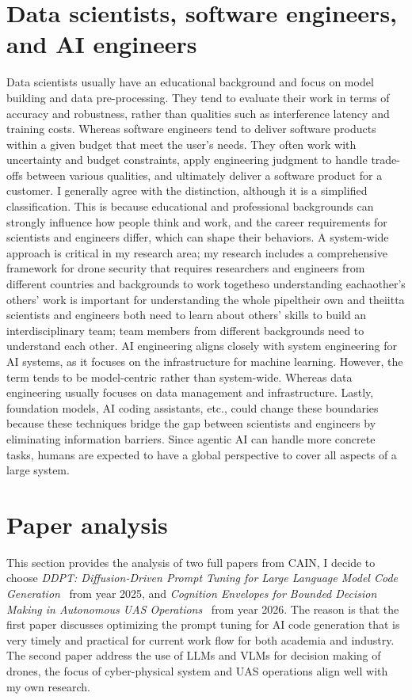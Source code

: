 \documentclass[11pt]{article}
\begin{document}
\section{Data scientists, software engineers, and AI engineers}
Data scientists usually have an educational background and focus on model building and data pre-processing. They tend to evaluate their work in terms of accuracy and robustness, rather than qualities such as interference latency and training costs. Whereas software engineers tend to deliver software products within a given budget that meet the user's needs. They often work with uncertainty and budget constraints, apply engineering judgment to handle trade-offs between various qualities, and ultimately deliver a software product for a customer. I generally agree with the distinction, although it is a simplified classification. This is because educational and professional backgrounds can strongly influence how people think and work, and the career requirements for scientists and engineers differ, which can shape their behaviors. A system-wide approach is critical in my research area; my research includes a comprehensive framework for drone security that requires researchers and engineers from different countries and backgrounds to work togetheso understanding eachaother's others' work is important for understanding the whole pipeltheir own and theiitta scientists and engineers both need to learn about others' skills to build an interdisciplinary team; team members from different backgrounds need to understand each other. AI engineering aligns closely with system engineering for AI systems, as it focuses on the infrastructure for machine learning. However, the term tends to be model-centric rather than system-wide. Whereas data engineering usually focuses on data management and infrastructure. Lastly, foundation models, AI coding assistants, etc., could change these boundaries because these techniques bridge the gap between scientists and engineers by eliminating information barriers. Since agentic AI can handle more concrete tasks, humans are expected to have a global perspective to cover all aspects of a large system. 

\section{Paper analysis}
This section provides the analysis of two full papers from CAIN, I decide to choose \textit{DDPT: Diffusion-Driven Prompt Tuning for Large Language Model Code Generation}~\cite{DDPT} from year 2025, and \textit{Cognition Envelopes for Bounded Decision Making
in Autonomous UAS Operations}~\cite{2026cognitionenvelopesboundeddecision} from year 2026. The reason is that the first paper discusses optimizing the prompt tuning for AI code generation that is very timely and practical for current work flow for both academia and industry. The second paper address the use of LLMs and VLMs for decision making of drones, the focus of cyber-physical system and UAS operations align well with my own research. 
\end{document}
